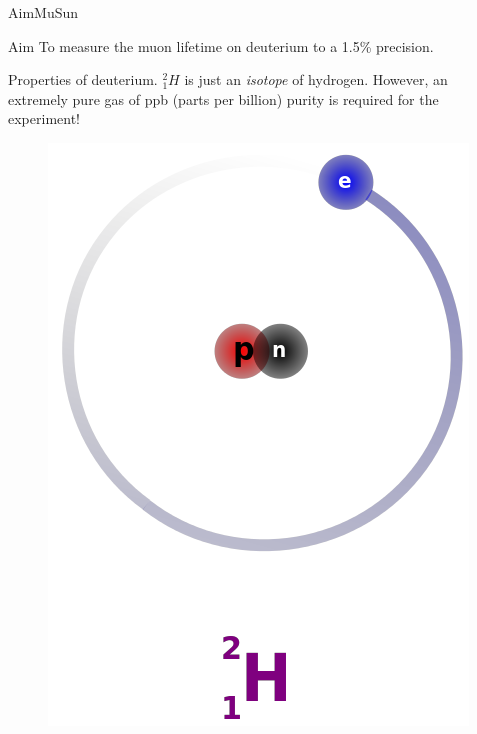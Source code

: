 \documentclass{beamer}
\begin{document}
\begin{frame}{Aim}{MuSun}
  \begin{block}{Aim}
To measure the muon lifetime on deuterium to a 1.5\% precision.  
     \end{block}
  
  \begin{block}{Properties of deuterium.}
${_{1}^{2}H}$ is just an \textit{isotope} of hydrogen. However, an extremely pure gas of ppb (parts per billion) purity is required for the experiment! 
\end{block}

\begin{figure}
\centering
\includegraphics[height=0.3\textheight]{figures/h.png}
\let\thefootnote\relax{}
\label{fig:my_label}
\end{figure}

\end{frame}

\end{document}
